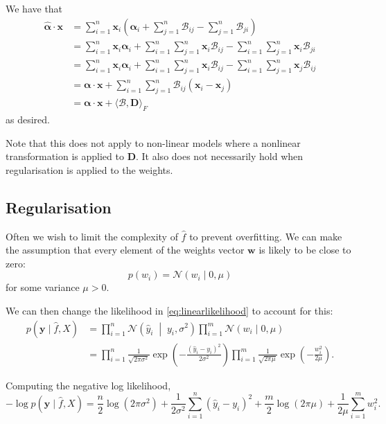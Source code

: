 \documentclass[11pt,twoside]{report}
\newcommand\bw{\mathbf{w}}
\newcommand\by{\mathbf{y}}
\newcommand\cN{\mathcal{N}}
\begin{document}
We have that\begin{align*}
    \hat{\bm{\alpha}} \cdot \mathbf{x} &= \sum_{i=1}^n \mathbf{x}_i\left( \bm{\alpha}_i + \sum_{j=1}^n \mathcal{B}_{ij} - \sum_{j=1}^n \mathcal{B}_{ji} \right) \\
    &= \sum_{i=1}^n \mathbf{x}_i\bm{\alpha}_i +  \sum_{i=1}^n \sum_{j=1}^n \mathbf{x}_i \mathcal{B}_{ij} - \sum_{i=1}^n \sum_{j=1}^n \mathbf{x}_i \mathcal{B}_{ji} \\
    &= \sum_{i=1}^n \mathbf{x}_i\bm{\alpha}_i +  \sum_{i=1}^n \sum_{j=1}^n \mathbf{x}_i \mathcal{B}_{ij} - \sum_{i=1}^n \sum_{j=1}^n \mathbf{x}_j \mathcal{B}_{ij} \\
    &= \bm{\alpha}\cdot\mathbf{x} +  \sum_{i=1}^n \sum_{j=1}^n \mathcal{B}_{ij} \left(\mathbf{x}_i - \mathbf{x}_j \right) \\
    &= \bm{\alpha}\cdot\mathbf{x} + \langle \mathcal{B}, \mathbf{D} \rangle_F
\end{align*} as desired.

Note that this does not apply to non-linear models where a nonlinear transformation is applied to $\mathbf{D}$. It also does not necessarily hold when regularisation is applied to the weights.

\subsection{Regularisation}
Often we wish to limit the complexity of $\hat f$ to prevent overfitting. We can make the assumption that every element of the weights vector $\bw$ is likely to be close to zero: \[
    p(w_i) = \cN(w_i \mid 0, \mu)
\] for some variance $\mu > 0$.

We can then change the likelihood in \cref{eq:linearlikelihood} to account for this: \begin{align*}
    p(\by \mid \hat f, X) &= \prod_{i = 1}^{n} \cN\left(\hat y_i \;\middle|\; y_i, \sigma^2\right) \label{eq:linearlikelihood} \prod_{i = 1}^{m}\cN(w_i \mid 0, \mu) \\
    &= \prod_{i = 1}^{n} \frac{1}{\sqrt{2\pi\sigma^2}} \exp\left(-\frac{\left(\hat y_i - y_i\right)^2}{2\sigma^2}\right) \prod_{i = 1}^{m}\frac{1}{\sqrt{2\pi\mu}} \exp\left(-\frac{w_i^2}{2\mu}\right) \text{.}
\end{align*}

Computing the negative log likelihood,\[
    -\log p(\by \mid \hat f, X) = \frac{n}{2}\log\left(2\pi\sigma^2\right) + \frac{1}{2\sigma^2}\sum_{i=1}^{n}\left(\hat y_i - y_i\right)^2 + \frac{m}{2}\log\left(2\pi\mu\right) + \frac{1}{2\mu}\sum_{i=1}^{m}w_i^2 \text{.}
\]
\end{document}
